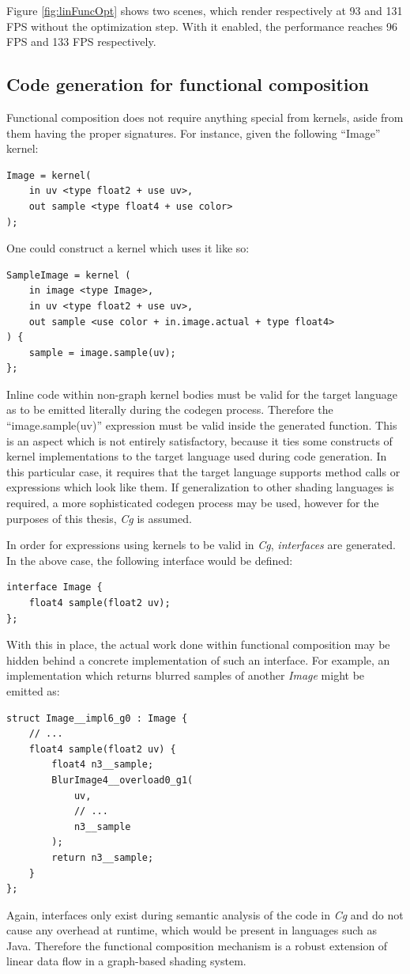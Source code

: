Figure \ref{fig:linFuncOpt} shows two scenes, which render respectively at 93 and 131 FPS without the optimization step. With it enabled, the performance reaches 96 FPS and 133 FPS respectively.

\subsection{Code generation for functional composition}

Functional composition does not require anything special from kernels, aside from them having the proper signatures. For instance, given the following ``Image'' kernel:
\begin{lstlisting}[frame=single]
Image = kernel(
    in uv <type float2 + use uv>,
    out sample <type float4 + use color>
);
\end{lstlisting}
One could construct a kernel which uses it like so:
\begin{lstlisting}[frame=single]
SampleImage = kernel (
	in image <type Image>,
	in uv <type float2 + use uv>,
	out sample <use color + in.image.actual + type float4>
) {
	sample = image.sample(uv);
};
\end{lstlisting}

Inline code within non-graph kernel bodies must be valid for the target language as to be emitted literally during the codegen process. Therefore the ``image.sample(uv)'' expression must be valid inside the generated function. This is an aspect which is not entirely satisfactory, because it ties some constructs of kernel implementations to the target language used during code generation. In this particular case, it requires that the target language supports method calls or expressions which look like them. If generalization to other shading languages is required, a more sophisticated codegen process may be used, however for the purposes of this thesis, \emph{Cg} is assumed.

In order for expressions using kernels to be valid in \emph{Cg}, \emph{interfaces} are generated. In the above case, the following interface would be defined:
\begin{lstlisting}[frame=single]
interface Image {
	float4 sample(float2 uv);
};
\end{lstlisting}

With this in place, the actual work done within functional composition may be hidden behind a concrete implementation of such an interface. For example, an implementation which returns blurred samples of another \emph{Image} might be emitted as:
\begin{lstlisting}[frame=single]
struct Image__impl6_g0 : Image {
	// ...
	float4 sample(float2 uv) {
		float4 n3__sample;
		BlurImage4__overload0_g1(
			uv,
			// ...
			n3__sample
		);
		return n3__sample;
	}
};
\end{lstlisting}

Again, interfaces only exist during semantic analysis of the code in \emph{Cg} and do not cause any overhead at runtime, which would be present in languages such as Java. Therefore the functional composition mechanism is a robust extension of linear data flow in a graph-based shading system.
